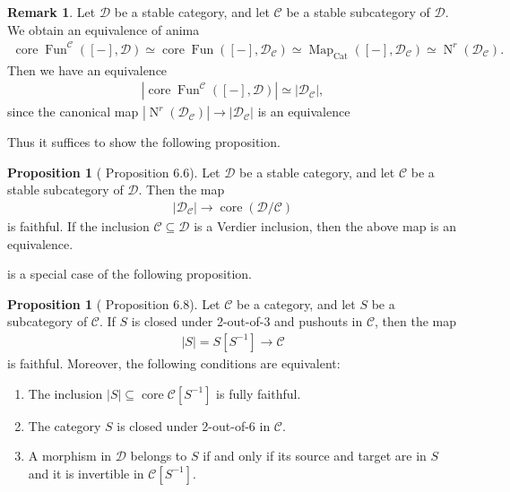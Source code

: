 \documentclass[a4paper,dvipdfmx,11pt,reqno]{amsart}
\DeclareMathOperator{\Map}{Map}
\DeclareMathOperator{\N}{N}
\DeclareMathOperator{\Fun}{Fun}
\newcommand{\C}{\mathcal{C}}
\newcommand{\D}{\mathcal{D}}
\DeclareMathOperator{\core}{core}
\newcommand{\Cat}{\mathrm{Cat}}
\theoremstyle{definition}
\newtheorem{proposition}[theorem]{Proposition}
\newtheorem{remark}[theorem]{Remark}
\begin{document}
\begin{remark}
  Let $\D$ be a stable category, and let $\C$ be a stable subcategory of $\D$.
  We obtain an equivalence of anima 
  \begin{align*}
    \core\Fun^{\C}([-],\D) 
    \simeq \core\Fun([-],\D_{\C})
    \simeq \Map_{\Cat}([-],\D_{\C})
    \simeq \N^r(\D_{\C}).
  \end{align*}
  Then we have an equivalence 
  \begin{align*}
    |\core\Fun^{\C}([-],\D)| \simeq |\D_{\C}|,
  \end{align*}
  since the canonical map $|\N^r(\D_{\C})| \to |\D_{\C}|$ is an equivalence
\end{remark}

Thus it suffices to show the following proposition.

\begin{proposition}[\cite{HLS23} Proposition 6.6] \label{HLS23.prop.6.6} 
  Let $\D$ be a stable category, and let $\C$ be a stable subcategory of $\D$.
  Then the map 
  \begin{align*}
    |\D_{\C}| \to \core(\D/\C)
  \end{align*}
  is faithful.
  If the inclusion $\C \subseteq \D$ is a Verdier inclusion, then the above map is an equivalence.
\end{proposition}

 is a special case of the following proposition.

\begin{proposition}[\cite{HLS23} Proposition 6.8] \label{HLS23.prop.6.8} 
  Let $\C$ be a category, and let $S$ be a subcategory of $\C$.
  If $S$ is closed under 2-out-of-3 and pushouts in $\C$, then the map 
  \begin{align*}
    |S| = S[S^{-1}] \to \C
  \end{align*}
  is faithful. 
  Moreover, the following conditions are equivalent:
  \begin{enumerate}
    \item The inclusion $|S| \subseteq \core\C[S^{-1}]$ is fully faithful.
    \item The category $S$ is closed under 2-out-of-6 in $\C$.
    \item A morphism in $\D$ belongs to $S$ if and only if its source and target are in $S$ and it is invertible in $\C[S^{-1}]$.
  \end{enumerate}
\end{proposition}
\end{document}

